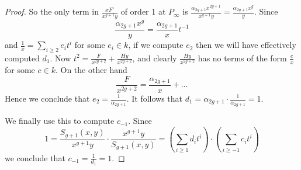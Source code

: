 \documentclass[draft, 11pt]{article} %
\theoremstyle{plain}
\theoremstyle{remark}
\begin{document}
\begin{proof}
So the only term in $\frac{xF'}{x^{g+1}y}$ of order 1 at $P_\infty$ is $\frac{\alpha_{2g+1}x^{2g+1}}{x^{g+1}y} = \frac{\alpha_{2g+1}x^{g}}{y}$.
Since
\[
\frac{\alpha_{2g+1}x^g}{y} = \frac{\alpha_{2g+1}}{x}t^{-1}
\]
and $\frac{1}{x} = \sum_{i\geq 2}e_it^i$ for some $e_i \in k$, if we compute $e_2$ then we will have effectively computed $d_1$.
Now $t^2 = \frac{F }{x^{2g+2}}+ \frac{Hy}{x^{2g+2}}$, and clearly $\frac{Hy}{x^{2g+2}}$ has no terms of the form $\frac{c}{x}$ for some $c \in k$.
On the other hand
\[
\frac{F}{x^{2g+2}} = \frac{\alpha_{2g+1}}{x} + \ldots
\]
Hence we conclude that $e_2 = \frac{1}{\alpha_{2g+1}}$.
It follows that $d_1 = \alpha_{2g+1} \cdot \frac{1}{\alpha_{2g+1}} = 1$.


We finally use this to compute $c_{-1}$.
Since 
\begin{equation*}
1 = \frac{S_{g+1}(x,y)}{x^{g+1}y}\cdot \frac{x^{g+1}y}{S_{g+1}(x,y)} = \left( \sum_{i\geq 1}d_it^i \right) \cdot \left( \sum_{i\geq -1}c_it^i\right)
\end{equation*}
we conclude that $c_{-1} = \frac{1}{d_{1}} = 1$.




\end{proof}
\end{document}
